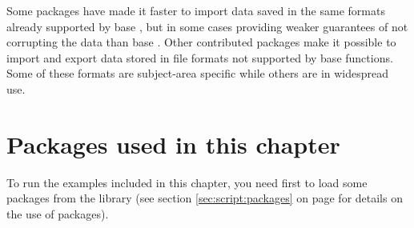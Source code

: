 \documentclass[krantz2]{krantz}\usepackage{knitr}
\begin{document}
Some \Rlang packages have made it faster to import data saved in the same formats already supported by base \Rlang, but in some cases providing weaker guarantees of not corrupting the data than base \Rlang. Other contributed packages make it possible to import and export data stored in file formats not supported by base \Rlang functions. Some of these formats are subject-area specific while others are in widespread use.

\section{Packages used in this chapter}

\begin{knitrout}\footnotesize
{}\color{fgcolor}\begin{kframe}
\begin{alltt}
\hlopt{::}
\end{alltt}
\end{kframe}
\end{knitrout}

To run the examples included in this chapter, you need first to load some packages from the library (see section \ref{sec:script:packages} on page \pageref{sec:script:packages} for details on the use of packages).

\begin{knitrout}\footnotesize
{}\color{fgcolor}\begin{kframe}
\begin{alltt}
\end{alltt}
\end{kframe}
\end{knitrout}
\end{document}
